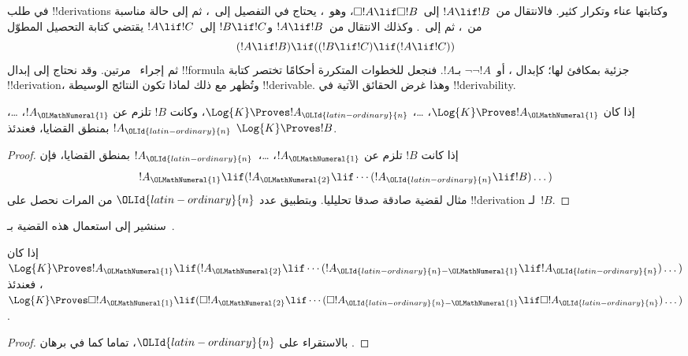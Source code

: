 \documentclass[../../../include/open-logic-section]{subfiles}
\begin{document}


في طلب !!{derivation}s وكتابتها عناء وتكرار كثير.
فالانتقال من~$!A \lif !B$ إلى~$\Box !A \lif \Box !B$، وهو~\RK،
يحتاج في التفصيل إلى~\Nec، ثم إلى حالة مناسبة من~،
ثم إلى~\MP. وكذلك الانتقال من~$!A \lif !B$ و$!B \lif !C$
إلى~$!A \lif !C$ يقتضي كتابة التحصيل المطوّل
\[
(!A \lif !B) \lif ((!B \lif !C) \lif (!A \lif !C))
\]
ثم إجراء~\MP{} مرتين. وقد نحتاج إلى إبدال !!{formula} جزئية
بمكافئ لها؛ كإبدال ،
أو~$\lnot\lnot !A$ بـ$!A$. فنجعل للخطوات المتكررة أحكامًا
تختصر كتابة !!{derivation}، وتُظهر مع ذلك لماذا تكون النتائج
الوسيطة !!{derivable}. وهذا غرض الحقائق الآتية في !!{derivability}.

\begin{prop}
  إذا كان $\Log{K} \Proves !A_{\OLMathNumeral{1}}$، \dots، $\Log{K} \Proves !A_{\OLId{latin-ordinary}{n}}$،
  وكانت $!B$ تلزم عن $!A_{\OLMathNumeral{1}}$، \dots، $!A_{\OLId{latin-ordinary}{n}}$ بمنطق القضايا، فعندئذ
  $\Log{K} \Proves !B$.
\end{prop}

\begin{proof}
  إذا كانت $!B$ تلزم عن $!A_{\OLMathNumeral{1}}$، \dots،~$!A_{\OLId{latin-ordinary}{n}}$ بمنطق القضايا، فإن
  \[
  !A_{\OLMathNumeral{1}} \lif (!A_{\OLMathNumeral{2}} \lif \cdots (!A_{\OLId{latin-ordinary}{n}} \lif !B)\dots)
  \]
  مثال لقضية صادقة صدقا تحليليا. وبتطبيق \MP{} عدد ${\OLId{latin-ordinary}{n}}$ من المرات
  نحصل على !!{derivation} لـ~$!B$.
\end{proof}

سنشير إلى استعمال هذه القضية بـ~\PL.

\begin{prop}
  إذا كان $\Log{K} \Proves !A_{\OLMathNumeral{1}} \lif (!A_{\OLMathNumeral{2}} \lif \cdots (!A_{{\OLId{latin-ordinary}{n}}-{\OLMathNumeral{1}}} \lif
  !A_{\OLId{latin-ordinary}{n}})\dots)$، فعندئذ $\Log{K} \Proves \Box !A_{\OLMathNumeral{1}} \lif (\Box !A_{\OLMathNumeral{2}} \lif
  \cdots (\Box !A_{{\OLId{latin-ordinary}{n}}-{\OLMathNumeral{1}}} \lif \Box !A_{\OLId{latin-ordinary}{n}})\dots)$.
\end{prop}

\begin{proof}
  بالاستقراء على ${\OLId{latin-ordinary}{n}}$، تماما كما في برهان .
\end{proof}
\end{document}
